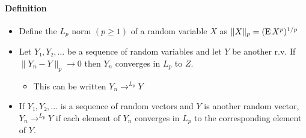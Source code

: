 \paragraph{Definition}
\begin{itemize}
\item Define the $L_p$ norm $(p ≥ 1)$ of a random variable $X$ as $\|X\|_p = (\operatorname{E} X^p)^{1/p}$
\item Let $Y₁, Y₂, ...$ be a sequence of random variables and let
        $Y$ be another r.v.  If $\|Y_n - Y\|_p → 0$ then $Y_n$
        converges in $L_p$ to $Z$.
\begin{itemize}
\item This can be written $Y_n →^{L_p} Y$
\end{itemize}
\item If $Y₁,Y₂,...$ is a sequence of random vectors and $Y$ is
        another random vector, $Y_n →^{L_p} Y$ if each element of
        $Y_n$ converges in $L_p$ to the corresponding element of $Y$.
\end{itemize}

